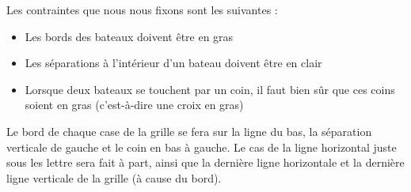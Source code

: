 Les contraintes que nous nous fixons sont les suivantes :
\begin{itemize}
\item Les bords des bateaux doivent être en gras
\item Les séparations à l'intérieur d'un bateau doivent être en clair
\item Lorsque deux bateaux se touchent par un coin, il faut bien sûr que ces coins soient en gras (c'est-à-dire une croix en gras)
\end{itemize}


Le bord de chaque case de la grille se fera sur la ligne du bas, la séparation verticale de gauche et le coin en bas à gauche. Le cas de la ligne horizontal juste sous les lettre sera fait à part, ainsi que la dernière ligne horizontale et la dernière ligne verticale de la grille (à cause du bord).

